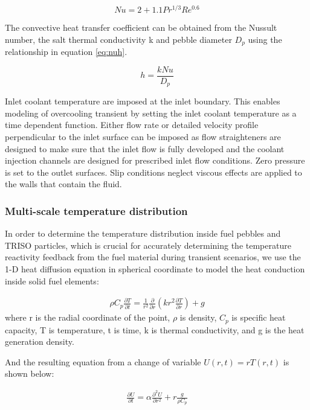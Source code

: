 \documentclass{elsarticle}
\begin{document}
\begin{equation}
  Nu = 2 + 1.1 Pr^{1/3}Re^{0.6} 
  \label{eq:wakao}
\end{equation}

The convective heat transfer coefficient can be obtained from the Nussult number, the salt thermal conductivity k and pebble diameter $D_p$ using the relationship in equation \ref{eq:nuh}.

\begin{equation}
  h = \frac{kNu}{D_p}
  \label{eq:nuh}
\end{equation}


Inlet coolant temperature are imposed at the inlet boundary.  This enables modeling of overcooling transient by setting the inlet coolant temperature as a time dependent function. Either flow rate or detailed velocity profile perpendicular to the inlet surface can be imposed as flow straighteners are designed to make sure that the inlet flow is fully developed and the coolant injection channels are designed for prescribed inlet flow conditions.
Zero pressure is set to the outlet surfaces. Slip conditions neglect viscous effects are applied to the walls that contain the fluid.  

\subsubsection{Multi-scale temperature distribution}

In order to determine the temperature distribution inside fuel pebbles and TRISO particles, which is crucial for accurately determining the temperature reactivity feedback from the fuel material during transient scenarios, we use the 1-D heat diffusion equation in spherical coordinate to model the heat conduction inside solid fuel elements:

\begin{align}
  \rho C_p\frac{\partial T}{\partial t} = \frac{1}{r^2}\frac{\partial}{\partial r}\left(kr^2\frac{\partial T}{\partial r}\right) + g
\end{align}
where r is the radial coordinate of the point, $\rho$ is density, $C_p$ is specific heat capacity, T is temperature, t is time, k is thermal conductivity, and g is the heat generation density.

And the resulting equation from a change of variable $U(r,t)=rT(r,t)$ is shown below:

\begin{align}
  \frac{\partial U}{\partial t} = \alpha \frac{\partial ^2 U}{\partial r^2} + r \frac{g}{\rho C_p}
\end{align}
\end{document}
